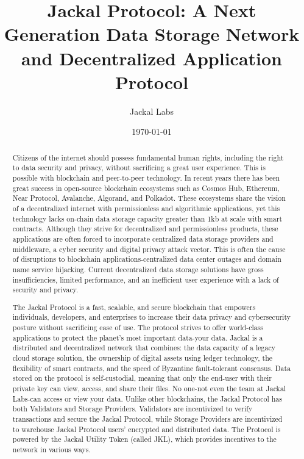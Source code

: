 \documentclass[a4paper]{article}
\begin{document}
\title{Jackal Protocol: A Next Generation Data Storage Network and Decentralized Application Protocol}

\author{Jackal Labs}

\date{\today}


\maketitle


\begin{abstract}
Citizens of the internet should possess fundamental human rights, including the right to data security and privacy, without sacrificing a great user experience. This is possible with blockchain and peer-to-peer technology. In recent years there has been great success in open-source blockchain ecosystems such as Cosmos Hub, Ethereum, Near Protocol, Avalanche, Algorand, and Polkadot. These ecosystems share the vision of a decentralized internet with permissionless and algorithmic applications, yet this technology lacks on-chain data storage capacity greater than 1kb at scale with smart contracts. Although they strive for decentralized and permissionless products, these applications are often forced to incorporate centralized data storage providers and middleware, a cyber security and digital privacy attack vector. This is often the cause of disruptions to blockchain applications-centralized data center outages and domain name service hijacking. Current decentralized data storage solutions have gross insufficiencies, limited performance, and an inefficient user experience with a lack of security and privacy.

The Jackal Protocol is a fast, scalable, and secure blockchain that empowers individuals, developers, and enterprises to increase their data privacy and cybersecurity posture without sacrificing ease of use. The protocol strives to offer world-class applications to protect the planet's most important data-your data. Jackal is a distributed and decentralized network that combines: the data capacity of a legacy cloud storage solution, the ownership of digital assets using ledger technology, the flexibility of smart contracts, and the speed of Byzantine fault-tolerant consensus. Data stored on the protocol is self-custodial, meaning that only the end-user with their private key can view, access, and share their files. No one-not even the team at Jackal Labs-can access or view your data.  Unlike other blockchains, the Jackal Protocol has both Validators and Storage Providers. Validators are incentivized to verify transactions and secure the Jackal Protocol, while Storage Providers are incentivized to warehouse Jackal Protocol users' encrypted and distributed data.  The Protocol is powered by the Jackal Utility Token (called JKL), which provides incentives to the network in various ways.
\end{abstract}
\end{document}

